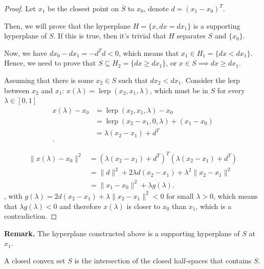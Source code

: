 \begin{proof}
  Let \( x_{1} \) be the closest point on \( \overline{S} \) to \( x_{0} \), denote \( d =
  (x_{1}-x_{0})^{T}\).

  Then, we will prove that the hyperplane \( H = \{x, dx = dx_{1}\}   \) is a
  supporting hyperplane of \( S \). If this is true, then it's trivial that \( H
  \) separates \( S \) and \( \{x_{0}\}   \).

  Now, we have \( dx_{0}-dx_{1}=-d^{T}d < 0 \), which means that \( x_{1} \in
  H_{1} = \{dx < dx_{1}\}   \). Hence, we need to prove that \( S \subseteq
  H_{2} = \{dx \ge  dx_{1}\}   \), or \( x \in S \implies dx \ge  dx_{1} \).

  Assuming that there is some \( x_{2} \in S \) such that \( dx_{2} < dx_{1} \).
  Consider the lerp between \( x_{2} \) and \( x_{1} \): \( x(\lambda) =
  \operatorname{lerp}(x_{2}, x_{1}, \lambda) \), which must be in \( S \) for
  every \( \lambda \in [0, 1] \)
  \begin{align*}
    x(\lambda) - x_{0} &= \operatorname{lerp}(x_{2}, x_{1}, \lambda) -
    x_{0}\\
                       &= \operatorname{lerp}(x_{2}-x_{1}, 0, \lambda) + (x_{1}
                       - x_{0})\\
                       &= \lambda(x_{2}-x_{1}) + d^{T}\\
  .\end{align*}

  \begin{align*}
    \|x(\lambda)-x_{0}\|^2 &= (\lambda(x_{2}-x_{1}) + d^{T})^{T}(\lambda(x_{2}-x_{1})
    + d^{T})\\
                           &= \|d\|^2 + 2\lambda d(x_{2}-x_{1}) + \lambda
                           ^2\|x_{2}-x_{1}\|^2\\
                           &= \|x_{1}-x_{0}\|^2 + \lambda g(\lambda)
  .\end{align*},
  with \( g(\lambda) = 2d(x_{2}-x_{1}) + \lambda \|x_{2}-x_{1}\|^2 < 0 \) for
  small \( \lambda > 0 \), which means that \( \lambda g(\lambda) < 0 \) and
  therefore \( x(\lambda) \) is closer to \( x_{0} \) than \( x_{1} \), which is
  a contradiction.
\end{proof}

\textbf{Remark. } The hyperplane constructed above is a supporting hyperplane of
\( S \) at \( x_{1} \).

\begin{corollary}
  A closed convex set \( S \) is the intersection of the closed half-spaces that
  contains \( S \).
\end{corollary}

